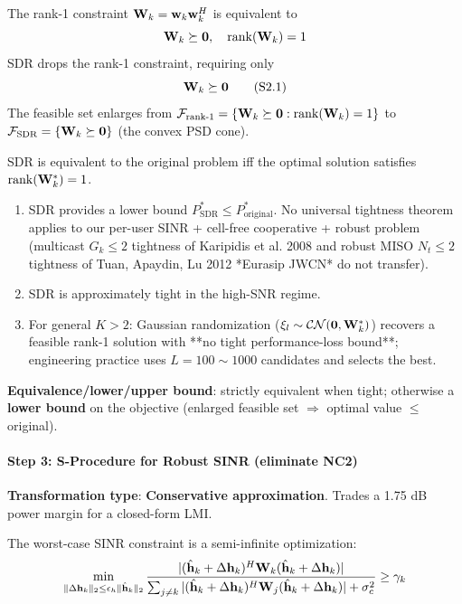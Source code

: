 The rank-1 constraint $\mathbf{W}_k = \mathbf{w}_k \mathbf{w}_k^H$ is equivalent to
\begin{equation}
\mathbf{W}_k \succeq \mathbf{0}, \quad \operatorname{rank}(\mathbf{W}_k) = 1
\end{equation}
SDR drops the rank-1 constraint, requiring only
\begin{equation}
\mathbf{W}_k \succeq \mathbf{0} \tag{S2.1}
\end{equation}
The feasible set enlarges from $\mathcal{F}_{\text{rank-1}} = \{\mathbf{W}_k \succeq \mathbf{0} : \operatorname{rank}(\mathbf{W}_k)=1\}$ to $\mathcal{F}_{\text{SDR}} = \{\mathbf{W}_k \succeq \mathbf{0}\}$ (the convex PSD cone).

\begin{proposition}\label{prop:sdr_tight}
SDR is equivalent to the original problem iff the optimal solution satisfies $\operatorname{rank}(\mathbf{W}_k^*) = 1$.
\begin{enumerate}
    \item SDR provides a lower bound $P_{\text{SDR}}^* \leq P_{\text{original}}^*$. No universal tightness theorem applies to our per-user SINR + cell-free cooperative + robust problem (multicast $G_k \leq 2$ tightness of Karipidis et al. 2008 and robust MISO $N_t \leq 2$ tightness of Tuan, Apaydin, Lu 2012 *Eurasip JWCN* do not transfer).
    \item SDR is approximately tight in the high-SNR regime.
    \item For general $K>2$: Gaussian randomization ($\xi_l \sim \mathcal{CN}(\mathbf{0}, \mathbf{W}_k^*)$) recovers a feasible rank-1 solution with **no tight performance-loss bound**; engineering practice uses $L = 100 \sim 1000$ candidates and selects the best.
\end{enumerate}
\end{proposition}

\textbf{Equivalence/lower/upper bound}: strictly equivalent when tight; otherwise a \textbf{lower bound} on the objective (enlarged feasible set $\Rightarrow$ optimal value $\leq$ original).

\paragraph{Step 3: S-Procedure for Robust SINR (eliminate NC2)}
\textbf{Transformation type}: \textbf{Conservative approximation}. Trades a 1.75 dB power margin for a closed-form LMI.

The worst-case SINR constraint is a semi-infinite optimization:
\begin{equation}
\min_{\|\Delta\mathbf{h}_k\|_2 \leq \epsilon_h \|\hat{\mathbf{h}}_k\|_2} \frac{|(\hat{\mathbf{h}}_k + \Delta\mathbf{h}_k)^H \mathbf{W}_k (\hat{\mathbf{h}}_k + \Delta\mathbf{h}_k)|}{\sum_{j\neq k}|(\hat{\mathbf{h}}_k + \Delta\mathbf{h}_k)^H \mathbf{W}_j(\hat{\mathbf{h}}_k + \Delta\mathbf{h}_k)| + \sigma_c^2} \geq \gamma_k
\end{equation}

